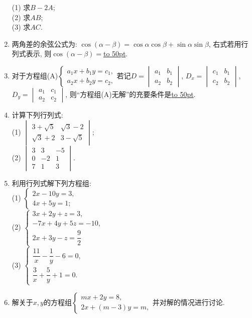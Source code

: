 \documentclass[10pt,a4paper]{article}
\newcommand{\blank}[1]{\underline{\hbox to #1pt{}}}
\begin{document}
\begin{enumerate}[1.]
(1) 求$B-2A$;\\
(2) 求$AB$;\\
(3) 求$AC$.
\item 两角差的余弦公式为: $\cos (\alpha -\beta)=\cos \alpha \cos \beta +\sin \alpha \sin \beta$, 右式若用行列式表示, 则$\cos (\alpha -\beta)=$\blank{50}.
\item 对于方程组(A)$\begin{cases}    a_1x+b_1y=c_1,  \\a_2x+b_2y=c_2,  \end{cases}$若记$D=\begin{vmatrix}
a_1 & b_1  \\a_2 & b_2  \end{vmatrix}$, $D_x=\begin{vmatrix}    c_1 & b_1  \\c_2 & b_2  \end{vmatrix}$, $D_y=\begin{vmatrix}    a_1 & c_1  \\a_2 & c_2  \end{vmatrix}$, 则``方程组(A)无解''的充要条件是\blank{50}.
\item 计算下列行列式:\\
(1) $\begin{vmatrix}    3+\sqrt 5 & \sqrt 3-2  \\\sqrt 3+2 & 3-\sqrt 5  \end{vmatrix}$;\\
(2) $\begin{vmatrix}    3 & 3 & -5  \\0 & -2 & 1  \\7 & 1 & 3  \end{vmatrix}$.
\item 利用行列式解下列方程组:\\
(1) $\begin{cases}    2x-10y=3,  \\4x+5y=1;  \end{cases}$\\ 
(2) $\begin{cases}    3x+2y+z=3,  \\-7x+4y+5z=-10,  \\2x+3y-z=\dfrac 92  \end{cases}$\\
(3) $\begin{cases}    \dfrac{11}x-\dfrac 1y-6=0,  \\\dfrac 3x+\dfrac 5y+1=0.  \end{cases}$
\item 解关于$x,y$的方程组$\begin{cases}    mx+2y=8,  \\2x+(m-3)y=m,  \end{cases}$并对解的情况进行讨论.

\end{enumerate}
\end{document}
